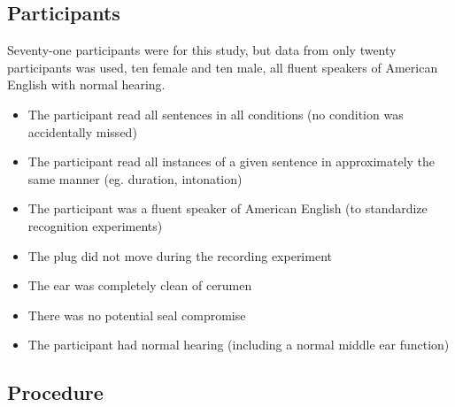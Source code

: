 \subsection{Participants}\DIFaddbegin \label{chap2:methods:participants}
\DIFaddend Seventy-one participants were \DIFdelbegin {}\DIFdelend \DIFaddbegin {}\DIFaddend for this study, but data from only twenty participants was used, ten female and ten male, all fluent speakers of American English with normal hearing.  \DIFaddbegin {}

\begin{itemize}
\item{The participant read all sentences in all conditions (no condition was accidentally missed)}
\item{The participant read all instances of a given sentence in approximately the same manner (eg. duration, intonation)}
\item{The participant was a fluent speaker of American English (to standardize recognition experiments)}
\item{The plug did not move during the recording experiment}
\item{The ear was completely clean of cerumen}
\item{There was no potential seal compromise}
\item{The participant had normal hearing (including a normal middle ear function)}
\end{itemize}

\DIFaddend 

\subsection{Procedure}\label{chap2:methods:procedure}

